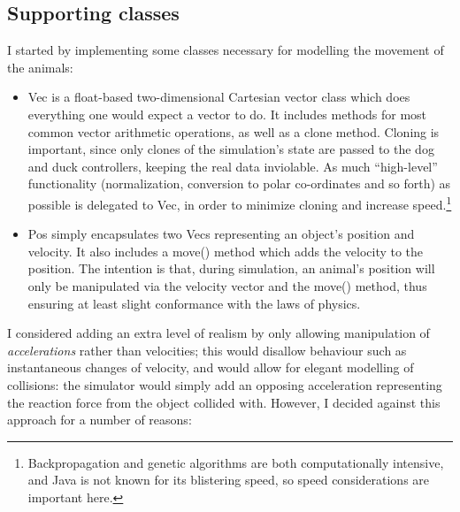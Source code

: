 \documentclass[a4paper]{report}
\newcommand{\code}[1]{{\ttfamily #1}}
\begin{document}
\subsection{Supporting classes}

I started by implementing some classes necessary for modelling the
movement of the animals:

\begin{itemize}
  
\item \code{Vec} is a \code{float}-based two-dimensional Cartesian
  vector class which does everything one would expect a vector to do.
  It includes methods for most common vector arithmetic operations, as
  well as a \code{clone} method. Cloning is important, since only
  clones of the simulation's state are passed to the dog and duck
  controllers, keeping the real data inviolable. As much
  ``high-level'' functionality (normalization, conversion to polar
  co-ordinates and so forth) as possible is delegated to \code{Vec},
  in order to minimize cloning and increase
  speed.\footnote{Backpropagation and genetic algorithms are both
    computationally intensive, and Java is not known for its
    blistering speed, so speed considerations are important here.}
  
\item \code{Pos} simply encapsulates two \code{Vecs} representing an
  object's position and velocity. It also includes a \code{move()}
  method which adds the velocity to the position. The intention is
  that, during simulation, an animal's position will only be
  manipulated via the velocity vector and the \code{move()} method,
  thus ensuring at least slight conformance with the laws of physics.

\end{itemize}

I considered adding an extra level of realism by only allowing
manipulation of \emph{accelerations} rather than velocities; this
would disallow behaviour such as instantaneous changes of velocity,
and would allow for elegant modelling of collisions: the simulator
would simply add an opposing acceleration representing the reaction
force from the object collided with. However, I decided against this
approach for a number of reasons:
\end{document}
